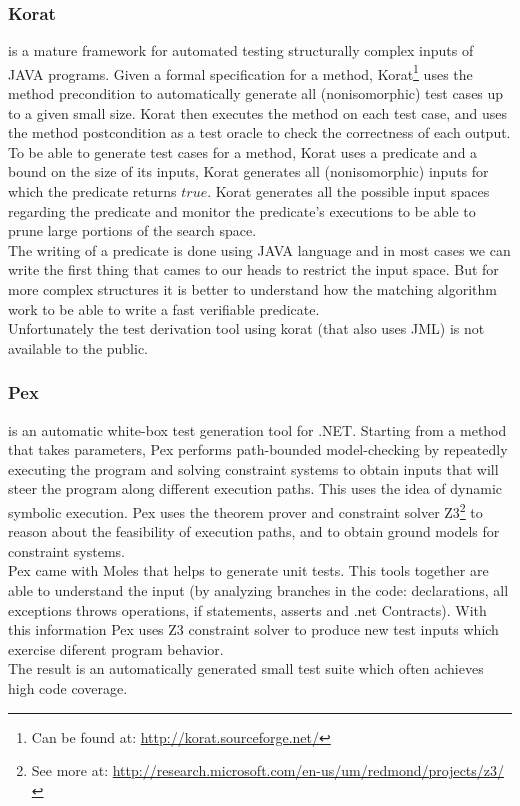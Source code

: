 \documentclass[10pt, conference, compsocconf]{IEEEtran}
\begin{document}

\subsubsection{\textbf{Korat}\cite{Boyapati02korat:automated}}
is a mature framework for automated testing structurally complex inputs of JAVA programs.
Given a formal specification for a method, Korat\footnote{Can be found at: \url{http://korat.sourceforge.net/}} uses the method precondition
to automatically generate all (nonisomorphic) test cases up to a given small size.
Korat then executes the method on each test case, and uses the method postcondition as a test oracle to check the correctness of each output.\\
To be able to generate test cases for a method, Korat uses a predicate and a bound on the size of its inputs,
Korat generates all (nonisomorphic) inputs for which the predicate returns $true$.
Korat generates all the possible input spaces regarding the predicate and monitor the predicate's executions to be able to prune large portions of the search space.\\

The writing of a predicate is done using JAVA language and in most cases we can write the first thing that cames to our heads to restrict the input space.
But for more complex structures it is better to understand how the matching algorithm work to be able to write a fast verifiable predicate.\\
Unfortunately the test derivation tool using korat (that also uses JML) is not available to the public.

\subsubsection{\textbf{Pex}\cite{Tillmann:2008:PWB:1792786.1792798}} is an automatic white-box test generation tool for .NET. Starting from a method that takes parameters, Pex performs path-bounded model-checking
by repeatedly executing the program and solving constraint systems to obtain inputs that will steer the program along different execution paths.
This uses the idea of dynamic symbolic execution\cite{Tillmann06unittests}. Pex uses the theorem prover and
constraint solver Z3\footnote{See more at: \url{http://research.microsoft.com/en-us/um/redmond/projects/z3/}} to reason about the feasibility of execution paths, and
to obtain ground models for constraint systems.\\
Pex came with Moles that helps to generate unit tests. This tools together are able to understand the input (by analyzing branches in the code:
declarations, all exceptions throws operations, if statements, asserts and .net Contracts). With this information Pex uses Z3 constraint solver to
produce new test inputs which exercise diferent program behavior.\\
The result is an automatically generated small test suite which often achieves high code coverage.\\
\end{document}
